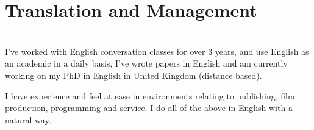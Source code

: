 \documentclass[a4paper,hidelinks]{twentysecondcv} %
\begin{document}
% 

\section{Translation and Management}

\\
I've worked with %
English conversation classes for over 3 years, 
and use English as an academic in a daily basis, 
I've wrote papers in English and am currently working on my PhD in English in United Kingdom (distance based). 



I have experience and feel at ease in environments relating to publishing, film production, programming and service. 
I do all of the above in English with a natural way.
\end{document}
